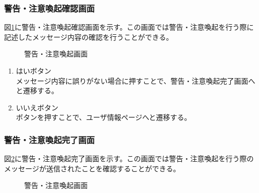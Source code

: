 \documentclass[a4j]{jarticle}
\begin{document}
\subsubsection{警告・注意喚起確認画面}
図\ref{fig:warning_confirm}に警告・注意喚起確認画面を示す。この画面では警告・注意喚起を行う際に記述したメッセージ内容の確認を行うことができる。
\begin{figure}[H]
\centering
{}
\caption{警告・注意喚起画面}
\label{fig:warning_confirm}
\end{figure}

\begin{enumerate}
  \renewcommand{\labelenumi}{\textcircled{\scriptsize \theenumi}}

\item はいボタン\\
メッセージ内容に誤りがない場合に押すことで、警告・注意喚起完了画面へと遷移する。
\item いいえボタン\\
ボタンを押すことで、ユーザ情報ページへと遷移する。
\end{enumerate}

\subsubsection{警告・注意喚起完了画面}
図\ref{fig:warning_ok}に警告・注意喚起完了画面を示す。この画面では警告・注意喚起を行う際のメッセージが送信されたことを確認することができる。
\begin{figure}[H]
\centering
{}
\caption{警告・注意喚起画面}
\label{fig:warning_ok}
\end{figure}
\end{document}
